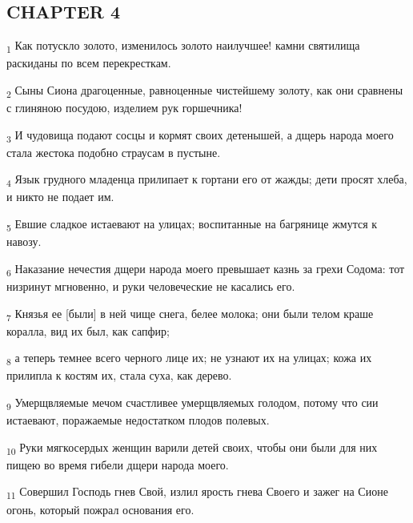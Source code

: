 \subsection{CHAPTER 4}
\begin{tcolorbox}
\textsubscript{1} Как потускло золото, изменилось золото наилучшее! камни святилища раскиданы по всем перекресткам.
\end{tcolorbox}
\begin{tcolorbox}
\textsubscript{2} Сыны Сиона драгоценные, равноценные чистейшему золоту, как они сравнены с глиняною посудою, изделием рук горшечника!
\end{tcolorbox}
\begin{tcolorbox}
\textsubscript{3} И чудовища подают сосцы и кормят своих детенышей, а дщерь народа моего стала жестока подобно страусам в пустыне.
\end{tcolorbox}
\begin{tcolorbox}
\textsubscript{4} Язык грудного младенца прилипает к гортани его от жажды; дети просят хлеба, и никто не подает им.
\end{tcolorbox}
\begin{tcolorbox}
\textsubscript{5} Евшие сладкое истаевают на улицах; воспитанные на багрянице жмутся к навозу.
\end{tcolorbox}
\begin{tcolorbox}
\textsubscript{6} Наказание нечестия дщери народа моего превышает казнь за грехи Содома: тот низринут мгновенно, и руки человеческие не касались его.
\end{tcolorbox}
\begin{tcolorbox}
\textsubscript{7} Князья ее [были] в ней чище снега, белее молока; они были телом краше коралла, вид их был, как сапфир;
\end{tcolorbox}
\begin{tcolorbox}
\textsubscript{8} а теперь темнее всего черного лице их; не узнают их на улицах; кожа их прилипла к костям их, стала суха, как дерево.
\end{tcolorbox}
\begin{tcolorbox}
\textsubscript{9} Умерщвляемые мечом счастливее умерщвляемых голодом, потому что сии истаевают, поражаемые недостатком плодов полевых.
\end{tcolorbox}
\begin{tcolorbox}
\textsubscript{10} Руки мягкосердых женщин варили детей своих, чтобы они были для них пищею во время гибели дщери народа моего.
\end{tcolorbox}
\begin{tcolorbox}
\textsubscript{11} Совершил Господь гнев Свой, излил ярость гнева Своего и зажег на Сионе огонь, который пожрал основания его.
\end{tcolorbox}
